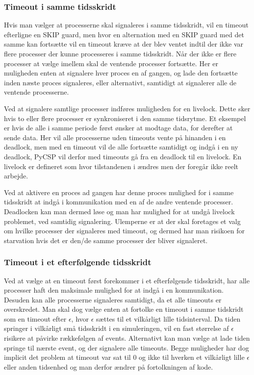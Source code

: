 \subsubsection{Timeout i samme tidsskridt}
Hvis man vælger at processerne skal signaleres i samme tidsskridt, vil en 
timeout efterligne en SKIP guard, men hvor en alternation med en SKIP guard 
med det samme kan fortsætte vil en timeout kræve at der blev ventet indtil der 
ikke var flere processer der kunne processeres i samme tidsskridt. Når der 
ikke er flere processer at vælge imellem skal de ventende processer fortsætte. 
Her er muligheden enten at signalere hver proces en af gangen, og lade den 
fortsætte inden næste proces signaleres, eller alternativt, samtidigt at 
signalerer alle de ventende processerne.

Ved at signalere samtlige processer indføres muligheden for en livelock. Dette
sker hvis to eller flere processer er  synkroniseret i den samme tidsrytme.
Et eksempel er hvis de alle i samme periode først ønsker at modtage data, for 
derefter at sende data. Her vil alle processerne uden timeouts vente på 
hinanden i en deadlock, men med en timeout vil de alle fortsætte samtidigt og 
indgå i en ny deadlock, PyCSP vil derfor med timeouts gå fra en deadlock til 
en livelock. En livelock er defineret som hvor tilstandenen i ændres men der
foregår ikke reelt arbejde. 

Ved at aktivere en proces ad gangen har denne proces mulighed for i samme 
tidsskridt at indgå i kommunikation med en af de andre ventende processer. 
Deadlocken kan man dermed løse og man har mulighed for at undgå livelock 
problemet, ved samtidig signalering.
Ulemperne er at der skal foretages et valg om hvilke processer der signaleres 
med  timeout, og dermed har man risikoen for starvation hvis det 
er den/de samme processer der bliver signaleret.

\subsubsection{Timeout i et efterfølgende tidsskridt}
Ved at vælge at en timeout først forekommer i et efterfølgende tidsskridt, har 
alle processer haft den maksimale mulighed for at indgå i en kommunikation. 
Desuden kan alle processerne signaleres samtidigt, da et alle  timeouts er 
overskredet. Man skal dog vælge enten at fortolke en timeout i samme tidskridt  
som en timeout efter $\epsilon$, hvor $\epsilon$ sættes til et vilkårligt 
lille tidsinterval. Da tiden springer i vilkårligt små tidsskridt i  en 
simuleringen, vil en fast størrelse af $\epsilon$ risikere at påvirke 
rækkefølgen af events. Alternativt kan man vælge at lade tiden springe til 
nærste event, og der signalere alle timeouts. Begge muligheder har dog 
implicit det problem at timeout var sat til 0 og ikke til hverken et 
vilkårligt lille $\epsilon$ eller anden tidsenhed og man derfor ændrer på 
fortolkningen af kode.

